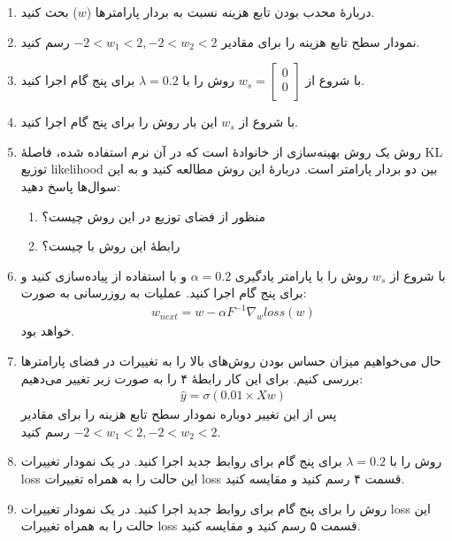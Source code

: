 \documentclass[11pt,a4paper]{article}
\begin{document}
\begin{enumerate}
\item
دربارهٔ محدب بودن تابع هزینه نسبت به بردار پارامترها ($w$) بحث کنید.
\item
نمودار سطح تابع هزینه را برای مقادیر 
$-2 < w_1 < 2 , -2 < w_2 < 2$
رسم کنید.
\item
با شروع از 
$w_s = \begin{bmatrix} 
0\\
0\\
\end{bmatrix}$
روش 
را با 
$\lambda = 0.2$
برای پنج گام اجرا کنید.
\item
با شروع از $w_s$ این بار روش  را برای پنج گام اجرا کنید.
\item
روش 
یک روش بهینه‌سازی از خانوادهٔ 
است که در آن نرم استفاده شده، فاصلهٔ KL توزیع likelihood بین دو بردار پارامتر است. دربارهٔ این روش مطالعه کنید و به این سوال‌ها پاسخ دهید:
\begin{enumerate}
\item
منظور از فضای توزیع
در این روش چیست؟
\item
رابطهٔ این روش با 
چیست؟
\end{enumerate}
\item
با شروع از $w_s$ روش 
را با پارامتر یادگیری 
$\alpha = 0.2$
و با استفاده از 
پیاده‌سازی کنید و برای پنج گام اجرا کنید. عملیات به روزرسانی به صورت:
\begin{align*}
w_{next} = w - \alpha F^{-1}\nabla_{w}loss(w)
\end{align*}
خواهد بود.
\item
حال می‌خواهیم میزان حساس بودن روش‌های بالا را به تغییرات در فضای پارامترها بررسی کنیم. برای این کار رابطهٔ ۴ را به صورت زیر تغییر می‌دهیم:
\begin{align*}
\hat{y} = \sigma(0.01 \times Xw)
\end{align*}
پس از این تغییر دوباره نمودار سطح تابع هزینه را برای مقادیر 
$-2 < w_1 < 2 , -2 < w_2 < 2$
رسم کنید.
\item
روش 
را با 
$\lambda = 0.2$
برای پنج گام برای روابط جدید اجرا کنید. در یک نمودار تغییرات loss این حالت را به همراه تغییرات loss قسمت ۴ رسم کنید و مقایسه کنید.
\item
روش 
را برای پنج گام برای روابط جدید اجرا کنید. در یک نمودار تغییرات loss این حالت را به همراه تغییرات loss قسمت ۵ رسم کنید و مقایسه کنید.

\end{enumerate}
\end{document}
